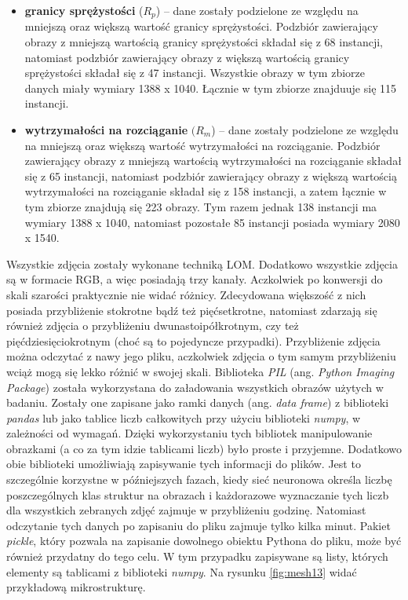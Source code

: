 \begin{itemize}
	\item \textbf{granicy sprężystości} ($R_p$) – dane zostały podzielone ze względu na mniejszą oraz większą wartość granicy sprężystości. Podzbiór zawierający obrazy z mniejszą wartością granicy sprężystości składał się z 68 instancji, natomiast podzbiór zawierający obrazy z większą wartością granicy sprężystości składał się z 47 instancji. Wszystkie obrazy w tym zbiorze danych miały wymiary 1388 x 1040. Łącznie w tym zbiorze znajduuje się 115 instancji.

	\item \textbf{wytrzymałości na rozciąganie} $(R_{m}$) – dane zostały podzielone ze względu na mniejszą oraz większą wartość wytrzymałości na rozciąganie. Podzbiór zawierający obrazy z mniejszą wartością wytrzymałości na rozciąganie składał się z 65 instancji, natomiast podzbiór zawierający obrazy z większą wartością wytrzymałości na rozciąganie składał się z 158 instancji, a zatem łącznie w tym zbiorze znajdują się 223 obrazy. Tym razem jednak 138 instancji ma wymiary 1388 x 1040, natomiast pozostałe 85 instancji posiada wymiary 2080 x 1540.
\end{itemize}
Wszystkie zdjęcia zostały wykonane techniką LOM. Dodatkowo wszystkie zdjęcia są w formacie RGB, a więc posiadają trzy kanały. Aczkolwiek po konwersji do skali szarości praktycznie nie widać różnicy. Zdecydowana większość z nich posiada przybliżenie stokrotne bądź też pięćsetkrotne, natomiast zdarzają się również zdjęcia o przybliżeniu dwunastoipółkrotnym, czy też pięćdziesięciokrotnym (choć są to pojedyncze przypadki). Przybliżenie zdjęcia można odczytać z nawy jego pliku, aczkolwiek zdjęcia o tym samym przybliżeniu wciąż mogą się lekko różnić w swojej skali. Biblioteka \textit{PIL} (ang. \textit{Python Imaging Package}) została wykorzystana do załadowania wszystkich obrazów użytych w badaniu. Zostały one zapisane jako ramki danych (ang. \textit{data frame}) z biblioteki \textit{pandas} lub jako tablice liczb całkowitych przy użyciu biblioteki \textit{numpy}, w zależności od wymagań. Dzięki wykorzystaniu tych bibliotek manipulowanie obrazkami (a co za tym idzie tablicami liczb) było proste i przyjemne. Dodatkowo obie biblioteki umożliwiają zapisywanie tych informacji do plików. Jest to szczególnie korzystne w późniejszych fazach, kiedy sieć neuronowa określa liczbę poszczególnych klas struktur na obrazach i każdorazowe wyznaczanie tych liczb dla wszystkich zebranych zdjęć zajmuje w przybliżeniu godzinę. Natomiast odczytanie tych danych po zapisaniu do pliku zajmuje tylko kilka minut. Pakiet \textit{pickle}, który pozwala na zapisanie dowolnego obiektu Pythona do pliku, może być również przydatny do tego celu. W tym przypadku zapisywane są listy, których elementy są tablicami z biblioteki \textit{numpy}. Na rysunku \ref{fig:mesh13} widać przykładową mikrostrukturę.
